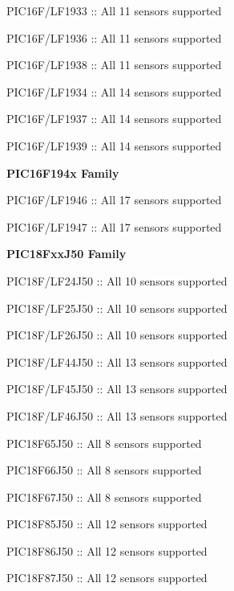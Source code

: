 \begin{DoxyItemize}
\begin{DoxyItemize}
\item P\+I\+C16\+F/\+L\+F1933 \+:\+: All 11 sensors supported 
\item P\+I\+C16\+F/\+L\+F1936 \+:\+: All 11 sensors supported 
\item P\+I\+C16\+F/\+L\+F1938 \+:\+: All 11 sensors supported 
\item P\+I\+C16\+F/\+L\+F1934 \+:\+: All 14 sensors supported 
\item P\+I\+C16\+F/\+L\+F1937 \+:\+: All 14 sensors supported 
\item P\+I\+C16\+F/\+L\+F1939 \+:\+: All 14 sensors supported 
\end{DoxyItemize}\item {\bfseries P\+I\+C16\+F194x Family} 
\begin{DoxyItemize}
\item P\+I\+C16\+F/\+L\+F1946 \+:\+: All 17 sensors supported 
\item P\+I\+C16\+F/\+L\+F1947 \+:\+: All 17 sensors supported 
\end{DoxyItemize}\item {\bfseries P\+I\+C18\+Fxx\+J50 Family} 
\begin{DoxyItemize}
\item P\+I\+C18\+F/\+L\+F24\+J50 \+:\+: All 10 sensors supported 
\item P\+I\+C18\+F/\+L\+F25\+J50 \+:\+: All 10 sensors supported 
\item P\+I\+C18\+F/\+L\+F26\+J50 \+:\+: All 10 sensors supported 
\item P\+I\+C18\+F/\+L\+F44\+J50 \+:\+: All 13 sensors supported 
\item P\+I\+C18\+F/\+L\+F45\+J50 \+:\+: All 13 sensors supported 
\item P\+I\+C18\+F/\+L\+F46\+J50 \+:\+: All 13 sensors supported 
\item P\+I\+C18\+F65\+J50 \+:\+: All 8 sensors supported 
\item P\+I\+C18\+F66\+J50 \+:\+: All 8 sensors supported 
\item P\+I\+C18\+F67\+J50 \+:\+: All 8 sensors supported 
\item P\+I\+C18\+F85\+J50 \+:\+: All 12 sensors supported 
\item P\+I\+C18\+F86\+J50 \+:\+: All 12 sensors supported 
\item P\+I\+C18\+F87\+J50 \+:\+: All 12 sensors supported 
\end{DoxyItemize}\end{DoxyItemize}
